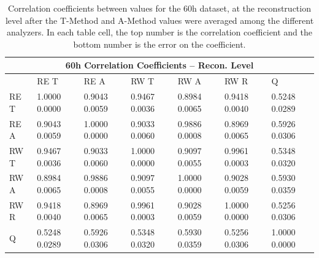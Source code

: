 \begin{table}[h]
\setlength\tabcolsep{15pt}
\small
\centering
\renewcommand{\arraystretch}{1.4}
\begin{tabularx}{0.8\linewidth}{@{\extracolsep{\fill}}lXXXXXX}
  \toprule
  	\multicolumn{7}{c}{{\normalsize 60h Correlation Coefficients -- Recon. Level}} \\
  \midrule
  	       & RE T & RE A & RW T & RW A & RW R & \quad Q \\
  \midrule
	RE T   & 1.0000 0.0000 & 0.9043 0.0059 & 0.9467 0.0036 & 0.8984 0.0065 & 0.9418 0.0040 & 0.5248 0.0289  \\
	RE A   & 0.9043 0.0059 & 1.0000 0.0000 & 0.9033 0.0060 & 0.9886 0.0008 & 0.8969 0.0065 & 0.5926 0.0306  \\
	RW T   & 0.9467 0.0036 & 0.9033 0.0060 & 1.0000 0.0000 & 0.9097 0.0055 & 0.9961 0.0003 & 0.5348 0.0320  \\
	RW A   & 0.8984 0.0065 & 0.9886 0.0008 & 0.9097 0.0055 & 1.0000 0.0000 & 0.9028 0.0059 & 0.5930 0.0359  \\
	RW R   & 0.9418 0.0040 & 0.8969 0.0065 & 0.9961 0.0003 & 0.9028 0.0059 & 1.0000 0.0000 & 0.5256 0.0306  \\
	Q      & 0.5248 0.0289 & 0.5926 0.0306 & 0.5348 0.0320 & 0.5930 0.0359 & 0.5256 0.0306 & 1.0000 0.0000  \\
  \bottomrule
\end{tabularx}
\caption[]{Correlation coefficients between \R values for the 60h dataset, at the reconstruction level after the \RW T-Method and A-Method \R values were averaged among the different analyzers. In each table cell, the top number is the correlation coefficient and the bottom number is the error on the coefficient.}
\label{tab:Corrs_60h_recon}
\end{table}




